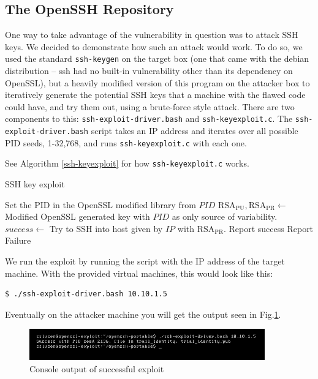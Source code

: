 \documentclass[conference]{IEEEtran}
\begin{document}
\subsection{The OpenSSH Repository}
One way to take advantage of the vulnerability in question was to
attack SSH keys. We decided to demonstrate how such an attack would
work. To do so, we used the standard \verb|ssh-keygen| on the target
box (one that came with the debian distribution -- ssh had no built-in
vulnerability other than its dependency on OpenSSL), but a heavily
modified version of this program on the attacker box to iteratively
generate the potential SSH keys that a machine with the flawed code
could have, and try them out, using a brute-force style attack. There
are two components to this: \verb|ssh-exploit-driver.bash| and
\verb|ssh-keyexploit.c|. The \verb|ssh-exploit-driver.bash| script
takes an IP address and iterates over all possible PID seeds,
1-32,768, and runs \verb|ssh-keyexploit.c| with each one.

See Algorithm \ref{ssh-keyexploit} for how \verb|ssh-keyexploit.c|
works.

\begin{algorithm}
  \caption{SSH key exploit}\label{ssh-keyexploit}

  \begin{algorithmic}[1]
    \State Set the PID in the OpenSSL modified library from $PID$
    \State $\mathrm{RSA}_{\mathrm{PU}}, \mathrm{RSA}_{\mathrm{PR}} \gets$ Modified OpenSSL generated key with $PID$ as only source of variability.
    \State $success \gets$ Try to SSH into host given by $IP$ with $\mathrm{RSA}_{\mathrm{PR}}$.
    \State Report success
    \Else
    \State Report Failure
    \EndIf
    \EndProcedure
  \end{algorithmic}
\end{algorithm}

We run the exploit by running the script with the IP address of the
target machine. With the provided virtual machines, this would look like this:

\begin{verbatim}
$ ./ssh-exploit-driver.bash 10.10.1.5
\end{verbatim}

Eventually on the attacker machine you will get the output seen in
Fig.\ref{successfulexploit}.

\begin{figure}
  \centering
  \includegraphics[width=4in]{images/SuccessfulExploit}
  \caption{Console output of successful exploit}
  \label{successfulexploit}
\end{figure}
\end{document}
